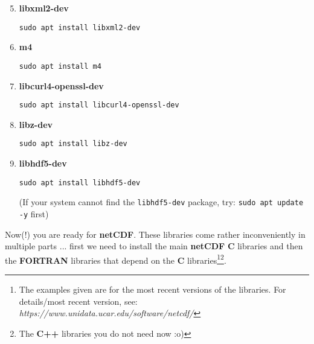 \documentclass[10pt,twoside]{article}
\begin{document}
\begin{enumerate}[noitemsep]
\setcounter{enumi}{4}

\vspace{2pt}
\item \textbf{libxml2-dev}
\vspace{-2pt}
\begin{verbatim}
sudo apt install libxml2-dev
\end{verbatim}

\vspace{2pt}
\item \textbf{m4}
\vspace{-2pt}
\begin{verbatim}
sudo apt install m4
\end{verbatim}

\vspace{2pt}
\item \textbf{libcurl4-openssl-dev}
\vspace{-2pt}
\begin{verbatim}
sudo apt install libcurl4-openssl-dev
\end{verbatim}

\vspace{2pt}
\item \textbf{libz-dev}
\vspace{-2pt}
\begin{verbatim}
sudo apt install libz-dev
\end{verbatim}

\vspace{2pt}
\item \textbf{libhdf5-dev}
\vspace{-2pt}
\begin{verbatim}
sudo apt install libhdf5-dev
\end{verbatim}

(If your system cannot find the \texttt{libhdf5-dev} package, try: \texttt{sudo apt update -y} first)

\end{enumerate}

\noindent Now(!) you are ready for \textbf{netCDF}. These libraries come rather inconveniently in multiple parts ... first we need to install the main \textbf{netCDF} \textbf{C} libraries and then the \textbf{FORTRAN} libraries that depend on the \textbf{C} libraries\footnote{The examples given are for the most recent versions of the libraries. For details/most recent version, see: \textit{https://www.unidata.ucar.edu/software/netcdf/}}\footnote{The \textbf{C++} libraries you do not need now :o)}. 
\end{document}

